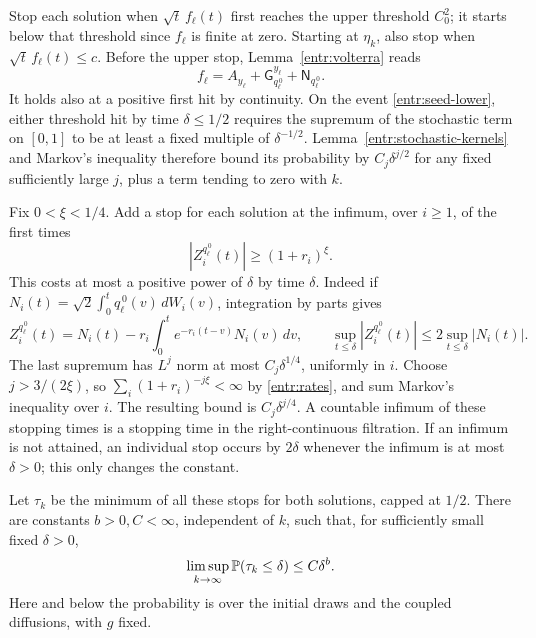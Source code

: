 Stop each solution when \(\sqrt t\,f_\ell(t)\) first reaches the
upper threshold \(C_0^2\); it starts below that threshold since
\(f_\ell\) is finite at zero.  Starting at \(\eta_k\), also stop
when \(\sqrt t\,f_\ell(t)\le c\).  Before the upper stop,
Lemma~\ref{entr:volterra} reads
\[
 f_\ell=A_{y_\ell}
       +\mathsf G_{q_\ell^{\,0}}^{y_\ell}
       +\mathsf N_{q_\ell^{\,0}}.
\]
It holds also at a positive first hit by continuity.  On the event
\eqref{entr:seed-lower}, either threshold hit by time \(\delta\le1/2\)
requires the supremum of the stochastic term on \([0,1]\) to be
at least a fixed multiple of \(\delta^{-1/2}\).
Lemma~\ref{entr:stochastic-kernels} and Markov's inequality therefore
bound its probability by \(C_j\delta^{j/2}\) for any fixed
sufficiently large \(j\), plus a term tending to zero with \(k\).

Fix \(0<\xi<1/4\).  Add a stop for each solution at the infimum,
over \(i\ge1\), of the first times
\[
 |Z_i^{q_\ell^{\,0}}(t)|\ge(1+r_i)^\xi.
\]
This costs at most a positive power of \(\delta\) by time \(\delta\).
Indeed if \(N_i(t)=\sqrt2\int_0^t q_\ell^{\,0}(v)\,dW_i(v)\),
integration by parts gives
\[
 Z_i^{q_\ell^{\,0}}(t)
 =N_i(t)-r_i\int_0^t e^{-r_i(t-v)}N_i(v)\,dv,
 \qquad
 \sup_{t\le\delta}|Z_i^{q_\ell^{\,0}}(t)|
       \le2\sup_{t\le\delta}|N_i(t)|.
\]
The last supremum has \(L^j\) norm at most \(C_j\delta^{1/4}\),
uniformly in \(i\).  Choose \(j>3/(2\xi)\), so
\(\sum_i(1+r_i)^{-j\xi}<\infty\) by \eqref{entr:rates}, and sum
Markov's inequality over \(i\).  The resulting bound is
\(C_j\delta^{j/4}\).  A countable infimum of these stopping times is
a stopping time in the right-continuous filtration.  If an infimum is
not attained, an individual stop occurs by \(2\delta\) whenever the
infimum is at most \(\delta>0\); this only changes the constant.

Let \(\tau_k\) be the minimum of all these stops for both solutions,
capped at \(1/2\).  There are constants \(b>0,C<\infty\), independent
of \(k\), such that, for sufficiently small fixed \(\delta>0\),
\begin{equation}\label{entr:stop-probability}
 \limsup_{k\to\infty}\mathbb P(\tau_k\le\delta)\le C\delta^b.
\end{equation}
Here and below the probability is over the initial draws and the
coupled diffusions, with \(g\) fixed.

